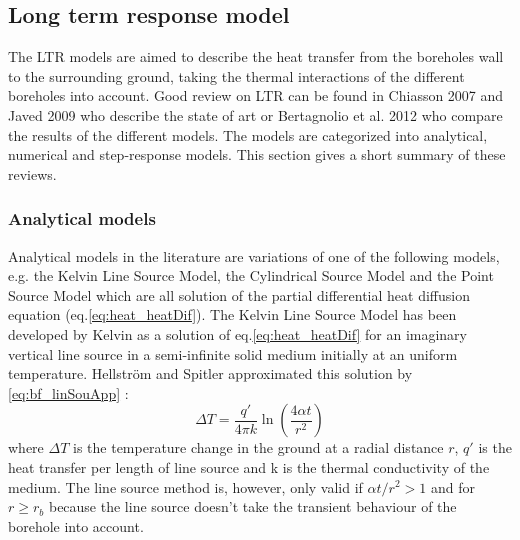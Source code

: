 \documentclass[a4paper,oneside,11pt]{report}
\begin{document}
\subsection{Long term response model} \label{ssec:bf_LTR}

The LTR models are aimed to describe the heat transfer from the boreholes wall to the surrounding ground, taking the thermal interactions of the different boreholes into account. Good review on LTR can be found in Chiasson 2007 \cite{chi07} and Javed 2009 \cite{jav09} who describe the state of art or Bertagnolio et al. 2012 \cite{bert12} who compare the results of the different models. The models are categorized into analytical, numerical and step-response models. This section gives a short summary of these reviews. 

\subsubsection*{Analytical models} \label{sssec:bf_LTR_ana}
Analytical models in the literature are variations of one of the following models, e.g. the Kelvin Line Source Model, the Cylindrical Source Model and the Point Source Model which are all solution of the partial differential heat diffusion equation (eq.\ref{eq:heat_heatDif}). The Kelvin Line Source Model has been developed by Kelvin as a solution of eq.\ref{eq:heat_heatDif} for an imaginary vertical line source in a semi-infinite solid medium initially at an uniform temperature. Hellstr\"om and Spitler approximated this solution by \ref{eq:bf_linSouApp} \cite{chi07}:
\begin{equation} \label{eq:bf_linSouApp}
	\Delta T = \frac{q'}{4 \pi k} \ln \left( \frac{ 4 \alpha t}{ r^2} \right)
\end{equation}
where $\Delta T$ is the temperature change in the ground at a radial distance $r$, $q'$ is the heat transfer per length of line source and k is the thermal conductivity of the medium. The line source method is, however, only valid if $ \alpha t / r^2 > 1 $ and for $r \geq r_b$ because the line source doesn't take the transient behaviour of the borehole into account.
\end{document}
